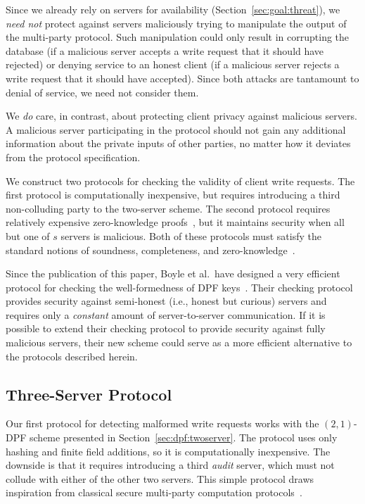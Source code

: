 \documentclass[10pt,twocolumn]{article}
\begin{document}
Since we already rely on servers for availability
(Section~\ref{sec:goal:threat}), we {\em need not} protect
against servers maliciously trying to manipulate the 
output of the multi-party protocol.
Such manipulation could only result in corrupting the database 
(if a malicious server accepts a write request that it should
have rejected)
or denying service to an honest client
(if a malicious server rejects a write request that it should
have accepted).
Since both attacks are tantamount to denial of service,
we need not consider them.

We {\em do} care, in contrast, about protecting 
client privacy against malicious servers.
A malicious server participating in the protocol
should not gain any additional information about
the private inputs of other parties, no matter how
it deviates from the protocol specification.

We construct two protocols for checking the validity
of client write requests.
The first protocol is computationally inexpensive, but 
requires introducing a third non-colluding party to 
the two-server scheme. 
The second protocol requires relatively expensive zero-knowledge proofs~\cite{feige1988zero,goldreich1991proofs,goldwasser1989knowledge,rackoff1992non},
but it maintains security when all but one
of $s$ servers is malicious.
Both of these protocols must satisfy the 
standard notions of soundness, completeness, and
zero-knowledge~\cite{camenisch1998group}.

Since the publication of this paper, Boyle et al.~have designed a very
efficient protocol for checking the well-formedness of DPF
keys~\cite{boyle2016function}.
Their checking protocol provides security against semi-honest (i.e., honest but curious) servers
and requires only a \textit{constant} amount of server-to-server communication.
If it is possible to extend their checking protocol to provide security against fully malicious
servers, their new scheme could serve as a more efficient alternative to the protocols described herein.

\subsection{Three-Server Protocol}
\label{sec:disrupt:smc}

Our first protocol for detecting malformed write requests
works with the $(2,1)$-DPF scheme presented in 
Section~\ref{sec:dpf:twoserver}.
The protocol uses only hashing and finite field additions, 
so it is computationally inexpensive.
The downside is that it requires introducing a third
{\em audit} server, which must not collude with either
of the other two servers.
This simple protocol draws inspiration from classical secure
multi-party computation protocols~\cite{fagin1996comparing,
goldreich1987play, yao1982protocols}.
\end{document}
